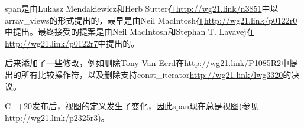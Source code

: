 span是由Lukasz Mendakiewicz和Herb Sutter在\url{http://wg21.link/n3851}中以array\_views的形式提出的，最早是由Neil MacIntosh在\url{http://wg21.link/p0122r0}中提出。最终接受的提案是由Neil MacIntosh和Stephan T. Lavavej在\url{http://wg21.link/p0122r7}中提出的。

后来添加了一些修改，例如删除Tony Van Eerd在\url{http://wg21.link/P1085R2}中提出的所有比较操作符，以及删除支持const\_iterator\url{http://wg21.link/lwg3320}的决议。

C++20发布后，视图的定义发生了变化，因此span现在总是视图(参见\url{http://wg21.link/p2325r3})。